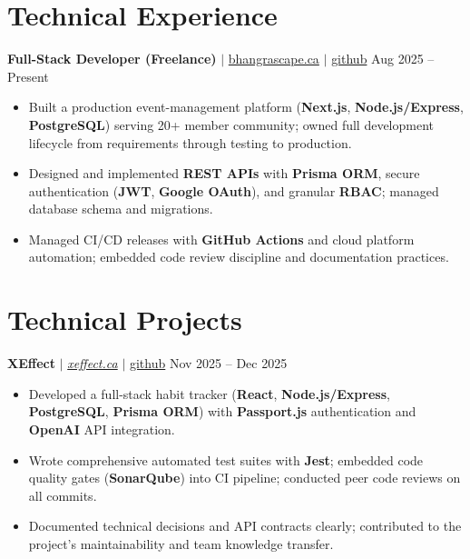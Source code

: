 \documentclass[11pt,a4paper]{article}
\begin{document}
\section{Technical Experience}

\textbf{Full-Stack Developer (Freelance)} $|$ \href{https://bhangrascape.ca}{bhangrascape.ca} $|$ \href{https://github.com/bhat0155/bhangraescape}{\small github} \hfill Aug 2025 -- Present
\begin{itemize}
    \item Built a production event-management platform (\textbf{Next.js}, \textbf{Node.js/Express}, \textbf{PostgreSQL}) serving 20+ member community; owned full development lifecycle from requirements through testing to production.
    \item Designed and implemented \textbf{REST APIs} with \textbf{Prisma ORM}, secure authentication (\textbf{JWT}, \textbf{Google OAuth}), and granular \textbf{RBAC}; managed database schema and migrations.
    \item Managed CI/CD releases with \textbf{GitHub Actions} and cloud platform automation; embedded code review discipline and documentation practices.
\end{itemize}

\section{Technical Projects}

\textbf{XEffect} $|$ \href{https://www.xeffect.ca/app}{\emph{xeffect.ca}} $|$ \href{https://github.com/bhat0155/xeffect}{\small github} \hfill Nov 2025 -- Dec 2025
\begin{itemize}
    \item Developed a full-stack habit tracker (\textbf{React}, \textbf{Node.js/Express}, \textbf{PostgreSQL}, \textbf{Prisma ORM}) with \textbf{Passport.js} authentication and \textbf{OpenAI} API integration.
    \item Wrote comprehensive automated test suites with \textbf{Jest}; embedded code quality gates (\textbf{SonarQube}) into CI pipeline; conducted peer code reviews on all commits.
    \item Documented technical decisions and API contracts clearly; contributed to the project's maintainability and team knowledge transfer.
\end{itemize}
\end{document}
